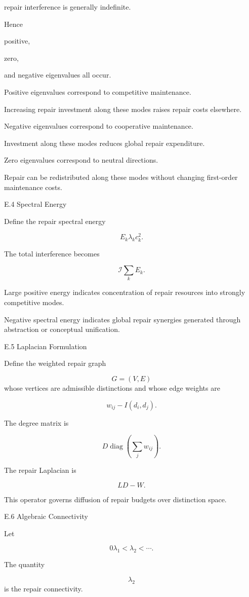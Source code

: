 \documentclass[12pt,oneside]{article}
\theoremstyle{plain}
\theoremstyle{definition}
\theoremstyle{remark}
\begin{document}
repair interference is generally indefinite.

Hence

positive,

zero,

and negative eigenvalues all occur.

Positive eigenvalues correspond to competitive maintenance.

Increasing repair investment along these modes raises repair costs elsewhere.

Negative eigenvalues correspond to cooperative maintenance.

Investment along these modes reduces global repair expenditure.

Zero eigenvalues correspond to neutral directions.

Repair can be redistributed along these modes without changing first-order maintenance costs.


E.4 Spectral Energy

Define the repair spectral energy

\[
E_k
\lambda_kc_k^2.
\]

The total interference becomes

\[
\mathcal I
\sum_k
E_k.
\]

Large positive energy indicates concentration of repair resources into strongly competitive modes.

Negative spectral energy indicates global repair synergies generated through abstraction or conceptual unification.


E.5 Laplacian Formulation

Define the weighted repair graph

\[
G=(V,E)
\]
whose vertices are admissible distinctions and whose edge weights are

\[
w_{ij}
-I(d_i,d_j).
\]

The degree matrix is

\[
D
\operatorname{diag}
\left(
\sum_jw_{ij}
\right).
\]

The repair Laplacian is

\[
L
D-W.
\]

This operator governs diffusion of repair budgets over distinction space.


E.6 Algebraic Connectivity

Let

\[
0
\lambda_1
<
\lambda_2
<
\cdots.
\]

The quantity

\[
\lambda_2
\]
is the repair connectivity.
\end{document}
